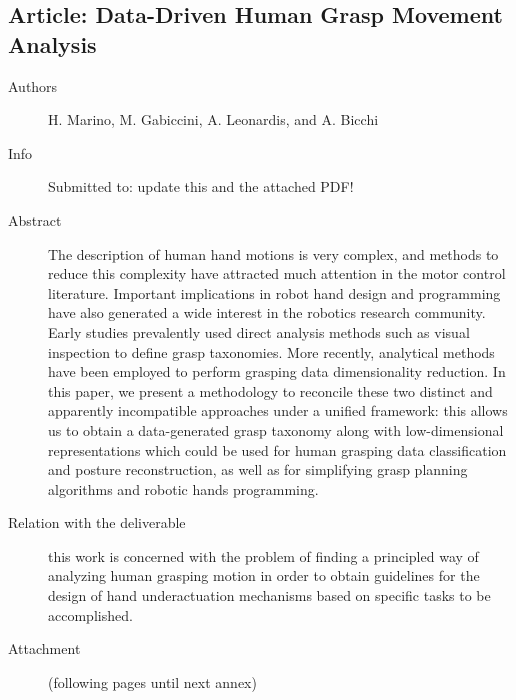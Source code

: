 \documentclass[a4paper,11pt,pdf]{pacmanreport}
\begin{document}

\subsection{Article: Data-Driven Human Grasp Movement Analysis}
\label{ann:DataDrivenHumanGraspMovementAnalysis}
\begin{description}
    \item[Authors] H. Marino, M. Gabiccini, A. Leonardis, and A. Bicchi
    \item[Info] Submitted to: {\color{red} update this and the attached PDF!}
    \item[Abstract] The description of human hand motions is very complex, and methods to reduce this complexity have attracted much attention in the motor control literature. Important implications in robot hand design and programming have also generated a wide interest in the robotics research community.
    Early studies prevalently used direct analysis methods such as visual inspection to define grasp taxonomies. More recently, analytical methods have been employed to perform grasping data dimensionality reduction. In this paper, we present a methodology to reconcile these two distinct and apparently incompatible approaches under a unified framework: this allows us to obtain a data-generated grasp taxonomy along with low-dimensional representations which could be used for human grasping data classification and posture reconstruction, as well as for simplifying grasp planning algorithms and robotic hands programming.
    \item[Relation with the deliverable] this work is concerned with the problem of finding a principled way of analyzing human grasping motion in order to obtain guidelines for the design of hand underactuation mechanisms based on specific tasks to be accomplished.
    \item[Attachment] (following pages until next annex)
\end{description}

\end{document}
